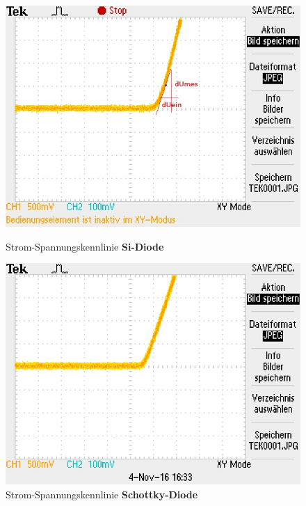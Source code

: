\begin{figure}[!h]
\begin{minipage}{0.4\textwidth}
\begin{center}
\includegraphics[scale=0.6]{bilder/Versuch2/siDiode}
\caption{Strom-Spannungskennlinie \textbf{Si-Diode}}
\end{center}
\end{minipage}
\hfill
\begin{minipage}{0.4\textwidth}
\begin{center}
\includegraphics[scale=0.6]{bilder/Versuch2/SchottkyDiode}
\caption{Strom-Spannungskennlinie \textbf{Schottky-Diode}}
\end{center}
\end{minipage}
\end{figure}
